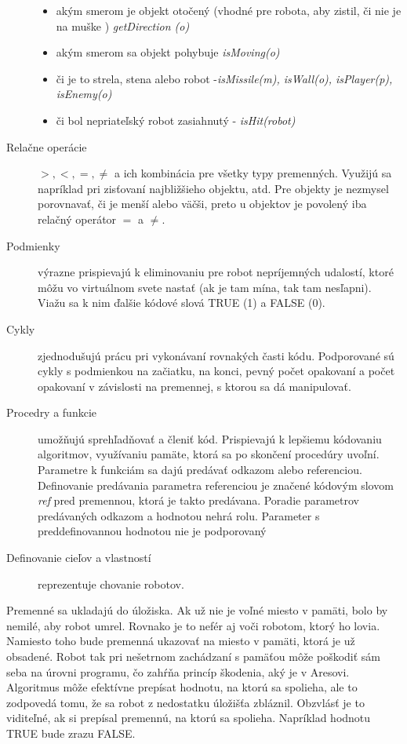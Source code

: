 \begin{description}
\begin{itemize}
\item akým smerom je objekt otočený (vhodné pre robota, aby zistil, či nie je na muške ) {\it getDirection (o) }
\item akým smerom sa objekt pohybuje { \it isMoving(o) }
\item či je to strela, stena alebo robot -{\it isMissile(m), isWall(o), isPlayer(p), isEnemy(o) }
\item či bol nepriateľský robot zasiahnutý - {\it isHit(robot)}
\end{itemize}
\item[Relačne operácie] $>, <, =, \ne $ a ich kombinácia pre všetky typy premenných. Využijú sa napríklad pri zisťovaní najbližšieho objektu, atd. Pre objekty je nezmysel porovnavať, či je menší alebo väčši, preto u objektov je povolený iba relačný operátor $=$ a $\ne$.
\item[Podmienky] výrazne prispievajú k eliminovaniu  pre robot nepríjemných udalostí, ktoré môžu vo virtuálnom svete nastať (ak je tam mína, tak tam nesľapni). Viažu sa k nim ďalšie kódové slová TRUE (1) a FALSE (0).
\item[Cykly] zjednodušujú prácu pri vykonávaní rovnakých časti kódu. Podporované sú cykly s podmienkou na začiatku, na konci, pevný počet opakovaní a počet opakovaní v závislosti na premennej, s ktorou sa dá manipulovať. %
\item[Procedry a funkcie] umožňujú sprehľadňovať a členiť kód. Prispievajú k lepšiemu kódovaniu algoritmov, využívaniu pamäte, ktorá sa po skončení procedúry uvoľní. Parametre k funkciám sa dajú predávať odkazom alebo referenciou.  Definovanie predávania parametra referenciou je značené kódovým slovom {\it ref} pred premennou, ktorá je takto predávana. Poradie parametrov predávaných odkazom a hodnotou nehrá rolu. Parameter s preddefinovannou hodnotou nie je podporovaný %
\item [Definovanie cieľov a vlastností] reprezentuje chovanie robotov. %
\end{description}

Premenné sa ukladajú do úložiska. Ak už nie je voľné miesto v pamäti, bolo by nemilé, aby robot umrel. Rovnako je to nefér aj voči robotom, ktorý ho lovia. Namiesto toho bude premenná ukazovať na miesto v pamäti, ktorá je už obsadené. Robot tak pri nešetrnom zachádzaní s pamäťou môže poškodiť sám seba na úrovni programu, čo zahŕňa princíp škodenia, aký je v Aresovi.
Algoritmus môže efektívne prepísat hodnotu, na ktorú sa spolieha, ale to zodpovedá tomu, že sa robot z nedostatku úložišťa zbláznil. Obzvlásť  je to viditeľné, ak si prepísal premennú, na ktorú sa spolieha. Napríklad hodnotu TRUE bude zrazu FALSE. \\


